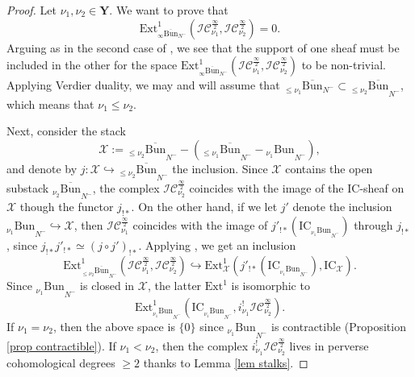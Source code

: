 \documentclass[11pt]{amsart}
\theoremstyle{plain}
\theoremstyle{remark}
\numberwithin{equation}{section}
\begin{document}
	\begin{proof}
		Let $\nu_1,\nu_2\in\mathbf{Y}$. We want to prove that 
		$$\mathrm{Ext}^1_{_{\infty}\overline{\mathrm{Bun}}_{N^-}}(\mathcal{IC}^{\frac{\infty}{2}}_{\nu_1},\mathcal{IC}^{\frac{\infty}{2}}_{\nu_2})=0. $$
		Arguing as in the second case of \cite[Proof of Proposition 4.4]{baumann:hal-01491529}, we see that the support of one sheaf must be included in the other for the space $\mathrm{Ext}^1_{_{\infty}\overline{\mathrm{Bun}}_{N^-}}(\mathcal{IC}^{\frac{\infty}{2}}_{\nu_1},\mathcal{IC}^{\frac{\infty}{2}}_{\nu_2})$ to be non-trivial.	Applying Verdier duality, we may and will assume that $_{\leq\nu_1}\overline{\mathrm{Bun}}_{N^-}\subset {_{\leq\nu_2}\overline{\mathrm{Bun}}}_{N^-}$, which means that $\nu_1\leq \nu_2$.
		
		Next, consider the stack 
		$$\mathcal{X}:={_{\leq\nu_2}\overline{\mathrm{Bun}}}_{N^-}-({_{\leq\nu_1}\overline{\mathrm{Bun}}}_{N^-}-{_{\nu_1}\mathrm{Bun}}_{N^-}), $$
		and denote by $j:\mathcal{X}\hookrightarrow {_{\leq\nu_2}\overline{\mathrm{Bun}}}_{N^-}$ the inclusion. Since $\mathcal{X}$ contains the open substack ${_{\nu_2}\overline{\mathrm{Bun}}}_{N^-}$, the complex $\mathcal{IC}^{\frac{\infty}{2}}_{\nu_2}$ coincides with the image of the $\mathrm{IC}$-sheaf on $\mathcal{X}$ though the functor $j_{!*}$. On the other hand, if we let $j'$ denote the inclusion ${_{\nu_1}\mathrm{Bun}}_{N^-}\hookrightarrow \mathcal{X}$, then $\mathcal{IC}^{\frac{\infty}{2}}_{\nu_1}$ coincides with the image of $j'_{!*}(\mathrm{IC}_{{_{\nu_1}\mathrm{Bun}}_{N^-}})$ through $j_{!*}$, since $j_{!*}j'_{!*}\simeq (j\circ j')_{!*}$. Applying \cite[Lemma 6.1.4]{FGV}, we get an inclusion
		$$\mathrm{Ext}^1_{{_{\leq\nu_2}\overline{\mathrm{Bun}}}_{N^-}}(\mathcal{IC}^{\frac{\infty}{2}}_{\nu_1},\mathcal{IC}^{\frac{\infty}{2}}_{\nu_2}) \hookrightarrow \mathrm{Ext}^1_{\mathcal{X}}(j'_{!*}(\mathrm{IC}_{{_{\nu_1}\mathrm{Bun}}_{N^-}}),\mathrm{IC}_{\mathcal{X}}). $$
		Since ${_{\nu_1}\mathrm{Bun}}_{N^-}$ is closed in $\mathcal{X}$, the latter $\mathrm{Ext}^1$ is isomorphic to 
		\begin{equation}\label{ext1}
			\mathrm{Ext}^1_{{_{\nu_1}\mathrm{Bun}}_{N^-}}(\mathrm{IC}_{{_{\nu_1}\mathrm{Bun}}_{N^-}},i^!_{\nu_1}\mathcal{IC}^{\frac{\infty}{2}}_{\nu_2}). 
		\end{equation}
		If $\nu_1=\nu_2$, then the above space is $\{0\}$ since ${_{\nu_1}\mathrm{Bun}}_{N^-}$ is contractible (Proposition \ref{prop contractible}). If $\nu_1<\nu_2$, then the complex $i^!_{\nu_1}\mathcal{IC}^{\frac{\infty}{2}}_{\nu_2}$ lives in perverse cohomological degrees $\geq 2$ thanks to Lemma \ref{lem stalks}. 
	\end{proof}
\end{document}

